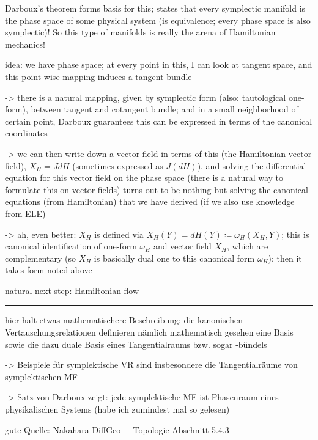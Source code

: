 \documentclass[../class_mech_main.tex]{subfiles}
\begin{document}
Darboux's theorem forms basis for this; states that every symplectic manifold is the phase space of some physical system (is equivalence; every phase space is also symplectic)! So this type of manifolds is really the arena of Hamiltonian mechanics!


idea: we have phase space; at every point in this, I can look at tangent space, and this point-wise mapping induces a tangent bundle

-> there is a natural mapping, given by symplectic form (also: tautological one-form), between tangent and cotangent bundle; and in a small neighborhood of certain point, Darboux guarantees this can be expressed in terms of the canonical coordinates

-> we can then write down a vector field in terms of this (the Hamiltonian vector field), $X_H = J dH$ (sometimes expressed as $J(dH)$), and solving the differential equation for this vector field on the phase space (there is a natural way to formulate this on vector fields) turns out to be nothing but solving the canonical equations (from Hamiltonian) that we have derived (if we also use knowledge from ELE)

-> ah, even better: $X_H$ is defined via $X_H(Y) = dH(Y) \coloneqq \omega_H(X_H, Y)$; this is canonical identification of one-form $\omega_H$ and vector field $X_H$, which are complementary (so $X_H$ is basically dual one to this canonical form $\omega_H$); then it takes form noted above


natural next step: Hamiltonian flow



\hrule



hier halt etwas mathematischere Beschreibung; die kanonischen Vertauschungsrelationen definieren nämlich mathematisch gesehen eine Basis sowie die dazu duale Basis eines Tangentialraums bzw. sogar -bündels

-> Beispiele für symplektische VR sind insbesondere die Tangentialräume von symplektischen MF

-> Satz von Darboux zeigt: jede symplektische MF ist Phasenraum eines physikalischen Systems (habe ich zumindest mal so gelesen)


gute Quelle: Nakahara DiffGeo + Topologie Abschnitt 5.4.3
\end{document}
